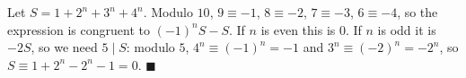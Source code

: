 Let $S=1+2^n+3^n+4^n$. Modulo $10$, $9\equiv-1$, $8\equiv-2$, $7\equiv-3$, $6\equiv-4$, so the expression is congruent to $(-1)^nS-S$. If $n$ is even this is $0$. If $n$ is odd it is $-2S$, so we need $5\mid S$: modulo $5$, $4^n\equiv(-1)^n=-1$ and $3^n\equiv(-2)^n=-2^n$, so $S\equiv1+2^n-2^n-1=0$. $\blacksquare$
